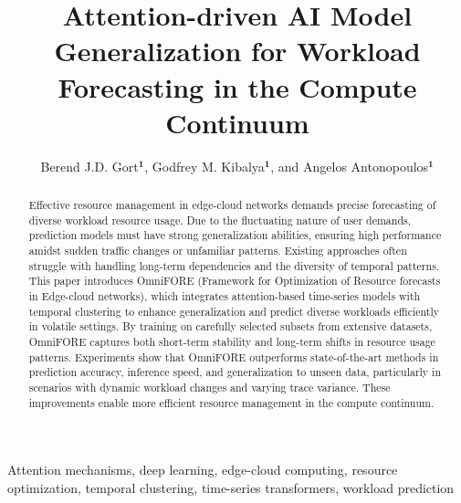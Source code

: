 \documentclass{ieeetmlcn}
\def\authorrefmark#1{\ensuremath{^{\textbf{#1}}}}
\begin{document}



\title{Attention-driven AI Model Generalization for Workload Forecasting in the Compute Continuum}

\author{Berend J.D. Gort\authorrefmark{1}, Godfrey M. Kibalya\authorrefmark{1}, and Angelos Antonopoulos\authorrefmark{1}}
\affil{\authorrefmark{1}Nearby Computing, Barcelona, Spain}




\begin{abstract}
Effective resource management in edge-cloud networks demands precise forecasting of diverse workload resource usage. Due to the fluctuating nature of user demands, prediction models must have strong generalization abilities, ensuring high performance amidst sudden traffic changes or unfamiliar patterns. Existing approaches often struggle with handling long-term dependencies and the diversity of temporal patterns. This paper introduces OmniFORE (Framework for Optimization of Resource forecasts in Edge-cloud networks), which integrates attention-based time-series models with temporal clustering to enhance generalization and predict diverse workloads efficiently in volatile settings. By training on carefully selected subsets from extensive datasets, OmniFORE captures both short-term stability and long-term shifts in resource usage patterns. Experiments show that OmniFORE outperforms state-of-the-art methods in prediction accuracy, inference speed, and generalization to unseen data, particularly in scenarios with dynamic workload changes and varying trace variance. These improvements enable more efficient resource management in the compute continuum.
\end{abstract}

\begin{IEEEkeywords}
Attention mechanisms, deep learning, edge-cloud computing, resource optimization, temporal clustering, time-series transformers, workload prediction
\end{IEEEkeywords}
\end{document}
